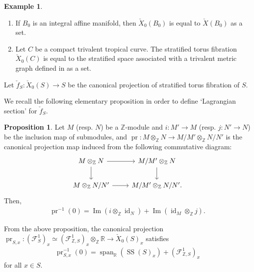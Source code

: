 \documentclass[a4paper,dvipdfmx,reqno,12pt]{amsart}
\theoremstyle{definition}
\newtheorem{example}[theorem]{Example}
\newtheorem{proposition}[theorem]{Proposition}
\newcommand{\opn}[1]{\operatorname{#1}}
\numberwithin{equation}{section}
\begin{document}
\begin{example}

\begin{enumerate}
\item If $B_0$ is an integral affine manifold, then
$\check{X}_0(B_0)$ is equal to $\check{X}(B_0)$ as a set.
\item 
Let $C$ be a compact trivalent tropical curve.
The stratified torus fibration $\check{X}_0(C)$ is equal to 
the stratified space associated
with a trivalent metric graph defined in \cite{auroux2022lagrangian}
as a set.
\end{enumerate}

\end{example}

Let $\check{f}_S\colon \check{X}_0(S)\to S$ be the 
canonical projection of stratified torus fibration of $S$.

We recall the following elementary proposition 
in order to define `Lagrangian section' for $\check{f}_S$.

\begin{proposition}

Let $M$ (resp. $N$) be a $\mathbb{Z}$-module and
$i\colon M'\to M$ (resp. $j\colon N'\to N$) be the 
inclusion map of submodules, and 
$\opn{pr}\colon M\otimes_{\mathbb{Z}}N \to M/M'\otimes_{\mathbb{Z}} N/N'$
is the canonical projection map induced from the following
commutative diagram:
\begin{equation}
\begin{tikzcd}
M\otimes_{\mathbb{Z}}N \arrow[d] \arrow[r] & M/M'\otimes_{\mathbb{Z}}N \arrow[d] \\
M\otimes_{\mathbb{Z}}N/N' \arrow[r]        & M/M'\otimes_{\mathbb{Z}}N/N'.       
\end{tikzcd}
\end{equation}
Then, 
\begin{align}
\opn{pr}^{-1}(0)=\opn{Im}(i\otimes_{\mathbb{Z}}\opn{id}_N)+
\opn{Im}(\opn{id}_M\otimes_{\mathbb{Z}}j).
\end{align}
\end{proposition}

From the above proposition,
the canonical projection
$\opn{pr}_{S,x}\colon (\mathcal{F}_{S}^{1})_x\simeq 
(\mathcal{F}_{\mathbb{Z},S}^{1})_x\otimes_{\mathbb{Z}}\mathbb{R}
\to \check{X}_0(S)_x$ satisfies 
\begin{align}
\label{equation-torus-fiber}
\opn{pr}_{S,x}^{-1}(0)
=\opn{span}_{\mathbb{R}}(\opn{SS}(S)_x)+
(\mathcal{F}^{1}_{\mathbb{Z},S})_x
\end{align}
for all $x\in S$.
\end{document}
